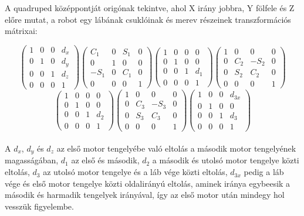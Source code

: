 \documentclass{article}
\begin{document}
	
	A quadruped középpontját origónak tekintve, ahol X irány jobbra, Y fölfele és Z előre mutat, a robot egy lábának csuklóinak és merev részeinek transzformációs mátrixai:
	
	$$
	\begin{pmatrix}
		1&0&0&d_x\\
		0&1&0&d_y\\
		0&0&1&d_z\\
		0&0&0&1
	\end{pmatrix}	
	\begin{pmatrix}
		C_1&0&S_1&0\\
		0&1&0&0\\
		-S_1&0&C_1&0\\
		0&0&0&1
	\end{pmatrix}	
	\begin{pmatrix}
		1&0&0&0\\
		0&1&0&0\\
		0&0&1&d_1\\
		0&0&0&1
	\end{pmatrix}	
	\begin{pmatrix}
		1&0&0&0\\
		0&C_2&-S_2&0\\
		0&S_2&C_2&0\\
		0&0&0&1
	\end{pmatrix}
	$$
	$$
	\begin{pmatrix}
		1&0&0&0\\
		0&1&0&0\\
		0&0&1&d_2\\
		0&0&0&1
	\end{pmatrix}	
	\begin{pmatrix}
		1&0&0&0\\
		0&C_3&-S_3&0\\
		0&S_3&C_3&0\\
		0&0&0&1
	\end{pmatrix}	
	\begin{pmatrix}
		1&0&0&d_{3x}\\
		0&1&0&0\\
		0&0&1&d_3\\
		0&0&0&1
	\end{pmatrix}
	$$	
	\\
	A $d_x$, $d_y$ és $d_z$ az első motor tengelyébe való eltolás a második motor tengelyének magasságában,	$d_1$ az első és második, $d_2$ a második és utolsó motor tengelye közti eltolás, $d_3$ az utolsó motor tengelye és a láb vége közti eltolás, $d_{3x}$ pedig a láb vége és első motor tengelye közti oldalirányú eltolás, aminek iránya egybeesik a második és harmadik tengelyek irányával, így az első motor után mindegy hol vesszük figyelembe.
\end{document}
